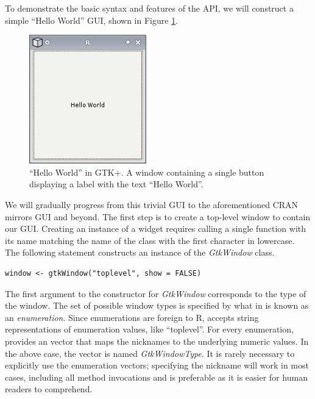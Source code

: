 \documentclass[article]{jss}
\begin{document}
To demonstrate the basic syntax and
features of the  API, we will construct a simple ``Hello World'' GUI,
shown in Figure \ref{fig:hello-world}. 

\begin{figure}
\begin{center}
\includegraphics[width=2in]{hello-world.png}
\caption{\label{fig:hello-world}``Hello World'' in GTK+. 
A window containing a single button displaying a label with the text
``Hello World''.}
\end{center}
\end{figure}

We will gradually 
progress from this trivial GUI to the aforementioned CRAN mirrors GUI and beyond.
The first step is to create a top-level window to contain our GUI.
Creating an instance of a  widget requires calling a single  
function with its name matching the name of the class with the first character in 
lowercase. The following statement constructs an instance of the \emph{GtkWindow} class.
\begin{verbatim}
window <- gtkWindow("toplevel", show = FALSE)
\end{verbatim}

The first argument to the constructor for \emph{GtkWindow} corresponds
to the type of the window. The set of possible window types is
specified by what in  is known as an
\emph{enumeration}. Since enumerations are foreign to R, 
accepts string representations of enumeration values, like
``toplevel''. For every  enumeration,  provides
an  vector that maps the nicknames to the underlying
numeric values.  In the above case, the vector is named
\emph{GtkWindowType}. It is rarely necessary to explicitly use the
enumeration vectors; specifying the nickname will work in most cases,
including all method invocations and is preferable as it is easier for
human readers to comprehend.
\end{document}
